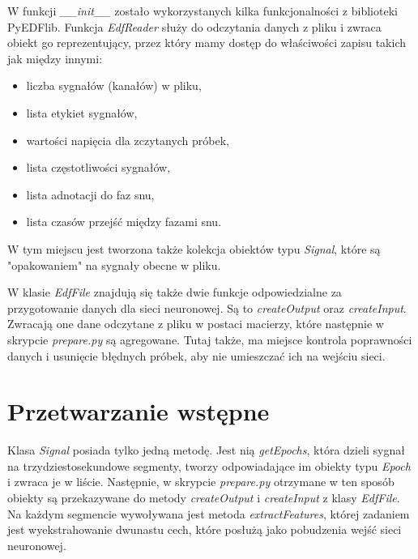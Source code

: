 \documentclass[12pt, notitlepage]{report}
\begin{document}
            W funkcji \textit{\_\_init\_\_} zostało wykorzystanych kilka funkcjonalności z biblioteki PyEDFlib. Funkcja \textit{EdfReader} służy do odczytania danych z pliku i zwraca obiekt go reprezentujący, przez który mamy dostęp do właściwości zapisu takich jak między innymi:
            \begin{itemize}
                \item liczba sygnałów (kanałów) w pliku,
                \item lista etykiet sygnałów,
                \item wartości napięcia dla zczytanych próbek,
                \item lista częstotliwości sygnałów,
                \item lista adnotacji do faz snu,
                \item lista czasów przejść między fazami snu.                
            \end{itemize}
            W tym miejscu jest tworzona także kolekcja obiektów typu \textit{Signal}, które są "opakowaniem" na sygnały obecne w pliku.

            W klasie \textit{EdfFile} znajdują się także dwie funkcje odpowiedzialne za przygotowanie danych dla sieci neuronowej. Są to \textit{createOutput} oraz \textit{createInput}. Zwracają one dane odczytane z pliku w postaci macierzy, które następnie w skrypcie \textit{prepare.py} są agregowane. Tutaj także, ma miejsce kontrola poprawności danych i usunięcie błędnych próbek, aby nie umieszczać ich na wejściu sieci.

        \section{Przetwarzanie wstępne}
            Klasa \textit{Signal} posiada tylko jedną metodę. Jest nią \textit{getEpochs}, która dzieli sygnał na trzydziestosekundowe segmenty, tworzy odpowiadające im obiekty typu \textit{Epoch} i zwraca je w liście.
            Następnie, w skrypcie \textit{prepare.py} otrzymane w ten sposób obiekty są przekazywane do metody \textit{createOutput} i \textit{createInput} z klasy \textit{EdfFile}. Na każdym segmencie wywoływana jest metoda \textit{extractFeatures}, której zadaniem jest wyekstrahowanie dwunastu cech, które posłużą jako pobudzenia wejść sieci neuronowej.
\end{document}
